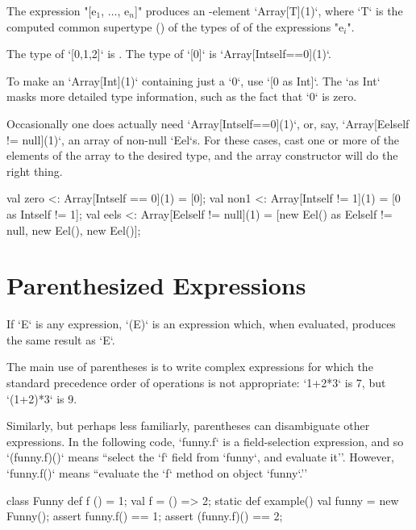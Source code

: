 The expression \xcdmath"[e$_1$, $\ldots$, e$_n$]" produces an -element
\xcd`Array[T](1)`, where \xcd`T` is the computed common supertype ()
of the types of of the expressions  \xcdmath"e$_i$". 

\begin{ex}
The type of
\xcd`[0,1,2]` is .    
The type of 
\xcd`[0]` is  \xcd`Array[Int{self==0}](1)`. 

To make an \xcd`Array[Int](1)` containing just a \xcd`0`, use
\xcd`[0 as Int]`.  The \xcd`as Int` masks more detailed type information, such
as the fact that \xcd`0` is zero.

\end{ex}



\begin{ex}
Occasionally one does actually need \xcd`Array[Int{self==0}](1)`, 
or, say, \xcd`Array[Eel{self != null}](1)`, an array of non-null \xcd`Eel`s.  
For these cases, cast one or more of the elements of the array to the desired type,
and the array constructor will do the right thing.  
\begin{xten}
val zero <: Array[Int{self == 0}](1) 
          = [0];
val non1 <: Array[Int{self != 1}](1) 
          = [0 as Int{self != 1}];
val eels <: Array[Eel{self != null}](1) 
          = [new Eel() as Eel{self != null}, 
             new Eel(), new Eel()];
\end{xten}
\end{ex}


\section{Parenthesized Expressions}

If \xcd`E` is any expression, \xcd`(E)` is an expression which, when
evaluated, produces the same result as \xcd`E`.   

\begin{ex}
The main use of parentheses is to write complex expressions for which the 
standard precedence order of operations is not appropriate: \xcd`1+2*3` is 7,
but \xcd`(1+2)*3` is 9.  

Similarly, but perhaps less familiarly, 
parentheses can disambiguate other expressions.  In the following code, 
\xcd`funny.f` is a field-selection expression, and so \xcd`(funny.f)()` means
``select the \xcd`f` field from \xcd`funny`, and evaluate it''.  However, 
\xcd`funny.f()` means ``evaluate the \xcd`f` method on object \xcd`funny`.''  
\begin{xten}
class Funny {
  def f () = 1;
  val f = () => 2;
  static def example() {
    val funny = new Funny();
    assert funny.f() == 1;
    assert (funny.f)() == 2;
  }
}
\end{xten}


\end{ex}

